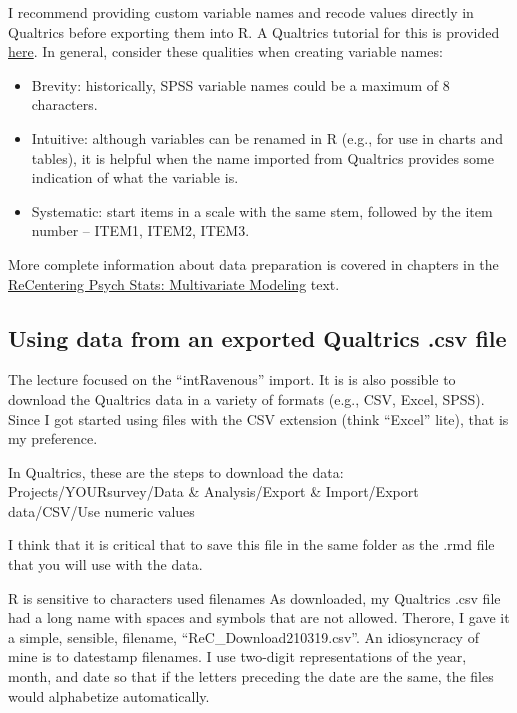 \documentclass[
  english,
]{book}
\providecommand{\tightlist}{%
  \setlength{\itemsep}{0pt}\setlength{\parskip}{0pt}}
\begin{document}
I recommend providing custom variable names and recode values directly in Qualtrics before exporting them into R. A Qualtrics tutorial for this is provided \href{https://www.qualtrics.com/support/survey-platform/survey-module/question-options/recode-values/}{here}. In general, consider these qualities when creating variable names:

\begin{itemize}
\tightlist
\item
  Brevity: historically, SPSS variable names could be a maximum of 8 characters.
\item
  Intuitive: although variables can be renamed in R (e.g., for use in charts and tables), it is helpful when the name imported from Qualtrics provides some indication of what the variable is.
\item
  Systematic: start items in a scale with the same stem, followed by the item number -- ITEM1, ITEM2, ITEM3.
\end{itemize}

More complete information about data preparation is covered in chapters in the \href{https://lhbikos.github.io/ReC_MultivariateModeling/}{ReCentering Psych Stats: Multivariate Modeling} text.

\hypertarget{using-data-from-an-exported-qualtrics-.csv-file}{%
\subsection{Using data from an exported Qualtrics .csv file}\label{using-data-from-an-exported-qualtrics-.csv-file}}

The lecture focused on the ``intRavenous'' import. It is is also possible to download the Qualtrics data in a variety of formats (e.g., CSV, Excel, SPSS). Since I got started using files with the CSV extension (think ``Excel'' lite), that is my preference.

In Qualtrics, these are the steps to download the data: Projects/YOURsurvey/Data \& Analysis/Export \& Import/Export data/CSV/Use numeric values

I think that it is critical that to save this file in the same folder as the .rmd file that you will use with the data.

R is sensitive to characters used filenames As downloaded, my Qualtrics .csv file had a long name with spaces and symbols that are not allowed. Therore, I gave it a simple, sensible, filename, ``ReC\_Download210319.csv''. An idiosyncracy of mine is to datestamp filenames. I use two-digit representations of the year, month, and date so that if the letters preceding the date are the same, the files would alphabetize automatically.
\end{document}
